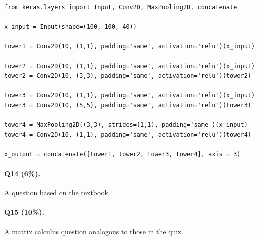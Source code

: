 \documentclass[11pt]{article}
\numberwithin{equation}{section}
\begin{document}
\begin{lstlisting}
from keras.layers import Input, Conv2D, MaxPooling2D, concatenate

x_input = Input(shape=(100, 100, 40))

tower1 = Conv2D(10, (1,1), padding='same', activation='relu')(x_input)

tower2 = Conv2D(10, (1,1), padding='same', activation='relu')(x_input)
tower2 = Conv2D(10, (3,3), padding='same', activation='relu')(tower2)

tower3 = Conv2D(10, (1,1), padding='same', activation='relu')(x_input)
tower3 = Conv2D(10, (5,5), padding='same', activation='relu')(tower3)

tower4 = MaxPooling2D((3,3), strides=(1,1), padding='same')(x_input)
tower4 = Conv2D(10, (1,1), padding='same', activation='relu')(tower4)

x_output = concatenate([tower1, tower2, tower3, tower4], axis = 3)
\end{lstlisting}
\vspace{3mm}




\paragraph{Q14 (6\%).} 
A question based on the textbook.



\paragraph{Q15 (10\%).} 
A matrix calculus question analogous to those in the quiz.




%

%
%
%
\end{document}
